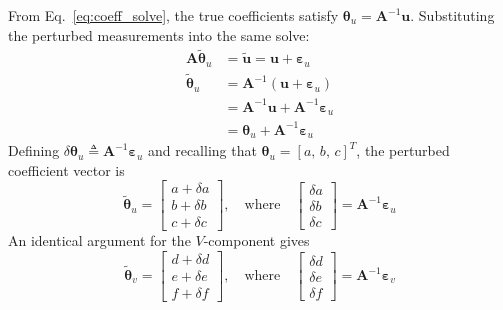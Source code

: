 \documentclass[lettersize,journal]{IEEEtran}
\begin{document}
From Eq.~\eqref{eq:coeff_solve}, the true coefficients satisfy $\boldsymbol{\theta}_u = \mathbf{A}^{-1}\mathbf{u}$. Substituting the perturbed measurements into the same solve:
\begin{align}
    \mathbf{A}\tilde{\boldsymbol{\theta}}_u &= \tilde{\mathbf{u}} = \mathbf{u} + \boldsymbol{\varepsilon}_u \nonumber \\
    \tilde{\boldsymbol{\theta}}_u &= \mathbf{A}^{-1}(\mathbf{u} + \boldsymbol{\varepsilon}_u) \nonumber \\
    &= \mathbf{A}^{-1}\mathbf{u} + \mathbf{A}^{-1}\boldsymbol{\varepsilon}_u \nonumber \\
    &= \boldsymbol{\theta}_u + \mathbf{A}^{-1}\boldsymbol{\varepsilon}_u
    \label{eq:perturbed_theta_u}
\end{align}
Defining $\delta\boldsymbol{\theta}_u \triangleq \mathbf{A}^{-1}\boldsymbol{\varepsilon}_u$ and recalling that $\boldsymbol{\theta}_u = [a,\, b,\, c]^T$, the perturbed coefficient vector is
\begin{equation}
    \tilde{\boldsymbol{\theta}}_u = \begin{bmatrix} a + \delta a \\ b + \delta b \\ c + \delta c \end{bmatrix}, \quad \text{where} \quad
    \begin{bmatrix} \delta a \\ \delta b \\ \delta c \end{bmatrix} = \mathbf{A}^{-1}\boldsymbol{\varepsilon}_u
    \label{eq:delta_theta_u}
\end{equation}
An identical argument for the $V$-component gives
\begin{equation}
    \tilde{\boldsymbol{\theta}}_v = \begin{bmatrix} d + \delta d \\ e + \delta e \\ f + \delta f \end{bmatrix}, \quad \text{where} \quad
    \begin{bmatrix} \delta d \\ \delta e \\ \delta f \end{bmatrix} = \mathbf{A}^{-1}\boldsymbol{\varepsilon}_v
    \label{eq:delta_theta_v}
\end{equation}
\end{document}
